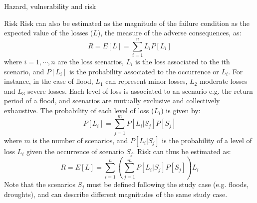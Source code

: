 \documentclass[8pt]{beamer}
\renewcommand{\emph}[1]{\textcolor{myorange}{#1}}
\begin{document}
\begin{frame}{Hazard, vulnerability and risk}
    \begin{block}{Risk}
        \emph{Risk} can also be estimated as the \emph{magnitude of the failure condition} as the \emph{expected value of the losses ($L$)}, the \emph{measure of the adverse consequences}, as:
        \[
            R = E[L] = \sum_{i=1}^n L_i P[L_i]
        \]
        where $i=1,\cdots, n$ are the loss scenarios, \emph{$L_i$ is the loss associated to the ith scenario}, and \emph{$P[L_i]$ is the probability associated to the occurrence or $L_i$}. For instance, in the case of flood, $L_1$ can represent  minor losses, $L_2$  moderate losses and $L_3$  severe losses. Each level of loss is associated to an scenario e.g. the return period of a flood, and scenarios are mutually exclusive and collectively exhaustive. The probability of each level of loss ($L_i$) is given by:
        \vspace{-5pt}
        \[
            P[L_i] = \sum_{j=1}^{m} P[L_i | S_j] P[S_j]
        \]
        where $m$ is the number of scenarios, and $P[L_i | S_j]$ is the probability of a level of loss $L_i$ given the occurrence of scenario $S_j$. Risk can thus be estimated as:
        \vspace{-5pt}
        \[
            R = E[L] = \sum_{i=1}^n \left( \sum_{j=1}^m P[L_i | S_j] P[S_j] \right) L_i 
        \] 
        Note that the scenarios $S_j$ must be defined following the study case (e.g. floods, droughts), and can \emph{describe different magnitudes} of the same study case. 

    \end{block}

\end{frame}
\end{document}
